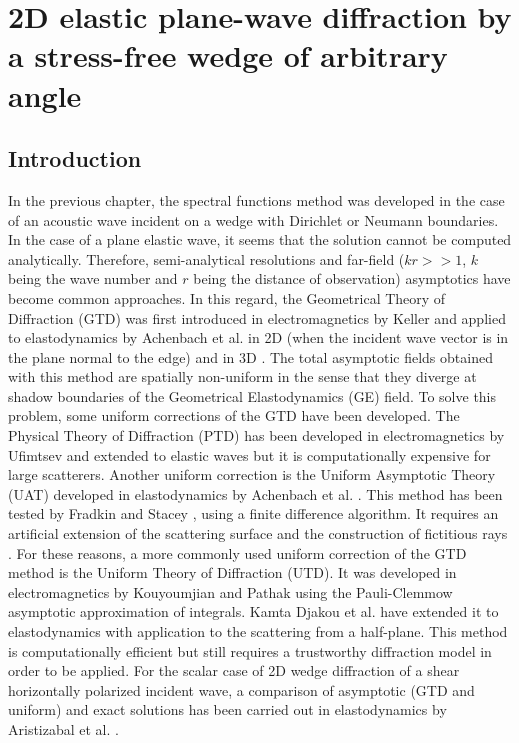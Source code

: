 \chapter[][2D Elastic Case]{2D elastic plane-wave diffraction by a stress-free wedge of arbitrary angle}
\label{chap-2D}

\section*{Introduction}
In the previous chapter, the spectral functions method was developed in the case of an acoustic wave incident on a wedge with Dirichlet or Neumann boundaries. In the case of a plane elastic wave, it seems that the solution cannot be computed analytically. Therefore, semi-analytical resolutions and far-field ($kr>>1$, $k$ being the wave number and $r$ being the distance of observation) asymptotics have become common approaches. In this regard, the Geometrical Theory of Diffraction (GTD) was first introduced in electromagnetics by Keller \cite{GTD} and applied to elastodynamics by Achenbach et al. in 2D (when the incident wave vector is in the plane normal to the edge)  and in 3D \cite{Achenbach, AchenbachGautesen}. The total asymptotic fields obtained with this method are spatially non-uniform in the sense that they diverge at shadow boundaries of the Geometrical Elastodynamics (GE) field. To solve this problem, some uniform corrections of the GTD have been developed. The Physical Theory of Diffraction (PTD) has been developed in electromagnetics by Ufimtsev \cite{Ufmi} and extended to elastic waves \cite{Zernov,PTDdarmon} but it is computationally expensive for large scatterers. Another uniform correction is the Uniform Asymptotic Theory (UAT) developed in elastodynamics by Achenbach et al. \cite{Achenbach}. This method has been tested by Fradkin and Stacey \cite{Fradkinelliptic}, using a finite difference algorithm. It requires an artificial extension of the scattering surface and the construction of fictitious rays \cite{Bouche}. For these reasons, a more commonly used uniform correction of the GTD method is the Uniform Theory of Diffraction (UTD). It was developed in electromagnetics by Kouyoumjian and Pathak \cite{Kouyoumjian} using the Pauli-Clemmow \cite{Pauli} asymptotic approximation of integrals. Kamta Djakou et al. \cite{Audrey} have extended it to elastodynamics with application to the scattering from a half-plane. This method is computationally efficient but still requires a trustworthy diffraction model in order to be applied. For the scalar case of 2D wedge diffraction of a shear horizontally polarized incident wave, a comparison of asymptotic (GTD and uniform) and exact solutions has been carried out in elastodynamics by Aristizabal et al. \cite{Aristizabal}.

